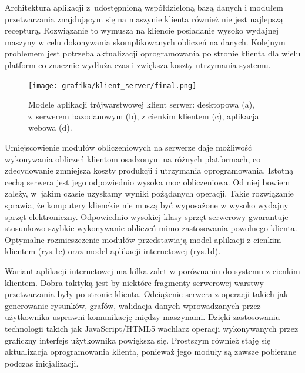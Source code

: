 \documentclass[a4paper,12pt,oneside]{mwrep}  %
\begin{document}
Architektura aplikacji z~udostępnioną współdzieloną bazą danych i modułem przetwarzania znajdującym się na maszynie klienta również nie jest najlepszą recepturą. Rozwiązanie to wymusza na kliencie posiadanie wysoko wydajnej maszyny w celu dokonywania skomplikowanych obliczeń na danych. Kolejnym problemem jest potrzeba aktualizacji oprogramowania po stronie klienta dla wielu platform co znacznie wydłuża czas i zwiększa koszty utrzymania systemu.
\cite{bioweb}
\begin{figure}[]
\centering
\texttt{[image: grafika/klient\_server/final.png]}
\caption{Modele aplikacji trójwarstwowej klient serwer: desktopowa (a), z~serwerem bazodanowym (b), z cienkim klientem (c), aplikacja webowa (d).}
\label{klient-serwer}
\end{figure}

Umiejscowienie modułów obliczeniowych na serwerze daje możliwość wykonywania obliczeń klientom osadzonym na różnych platformach, co zdecydowanie zmniejsza koszty produkcji i utrzymania oprogramowania. Istotną cechą serwera jest jego odpowiednio wysoka moc obliczeniowa. Od niej bowiem zależy, w~jakim czasie uzyskamy wyniki pożądanych operacji. Takie rozwiązanie sprawia, że komputery klienckie nie muszą być wyposażone w wysoko wydajny sprzęt elektroniczny. Odpowiednio wysokiej klasy sprzęt serwerowy gwarantuje stosunkowo szybkie wykonywanie obliczeń mimo zastosowania powolnego klienta. Optymalne rozmieszczenie modułów przedstawiają model aplikacji z cienkim klientem (rys.\ref{klient-serwer}c) oraz model aplikacji internetowej (rys.\ref{klient-serwer}d).
\cite{bioweb}

Wariant aplikacji internetowej ma kilka zalet w porównaniu do systemu z cienkim klientem. Dobra taktyką jest by niektóre fragmenty serwerowej warstwy przetwarzania były po stronie klienta. Odciążenie serwera z operacji takich jak generowanie rysunków, grafów, walidacja danych wprowadzanych przez użytkownika usprawni komunikację między maszynami. Dzięki zastosowaniu technologii takich jak JavaScript/HTML5 wachlarz operacji wykonywanych przez graficzny interfejs użytkownika powiększa się. Prostszym również staję się aktualizacja oprogramowania klienta, ponieważ jego moduły są zawsze pobierane podczas inicjalizacji.
\cite{bioweb}
\end{document}
